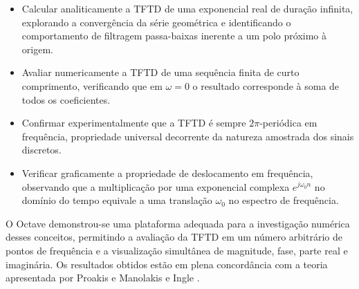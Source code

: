 \documentclass[tcc]{classe_uftex/uftex}
\begin{document}
\begin{itemize}
  \item Calcular analiticamente a TFTD de uma exponencial real de duração infinita, explorando a convergência da série geométrica e identificando o comportamento de filtragem passa-baixas inerente a um polo próximo à origem.
  \item Avaliar numericamente a TFTD de uma sequência finita de curto comprimento, verificando que em $\omega = 0$ o resultado corresponde à soma de todos os coeficientes.
  \item Confirmar experimentalmente que a TFTD é sempre $2\pi$-periódica em frequência, propriedade universal decorrente da natureza amostrada dos sinais discretos.
  \item Verificar graficamente a propriedade de deslocamento em frequência, observando que a multiplicação por uma exponencial complexa $e^{j\omega_0 n}$ no domínio do tempo equivale a uma translação $\omega_0$ no espectro de frequência.
\end{itemize}

O Octave \cite{octaveman} demonstrou-se uma plataforma adequada para a investigação numérica desses conceitos, permitindo a avaliação da TFTD em um número arbitrário de pontos de frequência e a visualização simultânea de magnitude, fase, parte real e imaginária. Os resultados obtidos estão em plena concordância com a teoria apresentada por Proakis e Manolakis \cite{proakis_manolakis} e Ingle \cite{ingle2017}.

\backmatter
\singlespacing

\end{document}
